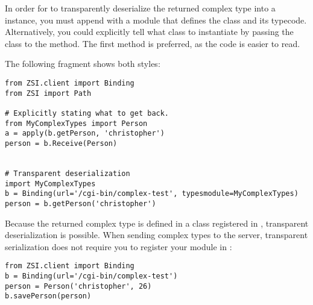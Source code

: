 In order for \ZSI{} to transparently deserialize the returned complex type into
a  instance, you must append  with a module that
defines the class and its typecode.  Alternatively, you could explicitly
tell \ZSI{} what class to instantiate by passing the class to the
 method.  The first method is preferred, as the code is
easier to read.

The following fragment shows both styles:

\begin{verbatim}
from ZSI.client import Binding
from ZSI import Path

# Explicitly stating what to get back.
from MyComplexTypes import Person
a = apply(b.getPerson, 'christopher')
person = b.Receive(Person)


# Transparent deserialization
import MyComplexTypes
b = Binding(url='/cgi-bin/complex-test', typesmodule=MyComplexTypes)
person = b.getPerson('christopher')
\end{verbatim}

Because the returned complex type is defined in a class registered in 
, transparent deserialization is possible.  When sending
complex types to the server, transparent serialization does not require you to
register your module in :

\begin{verbatim}
from ZSI.client import Binding
b = Binding(url='/cgi-bin/complex-test')
person = Person('christopher', 26)
b.savePerson(person)
\end{verbatim}
